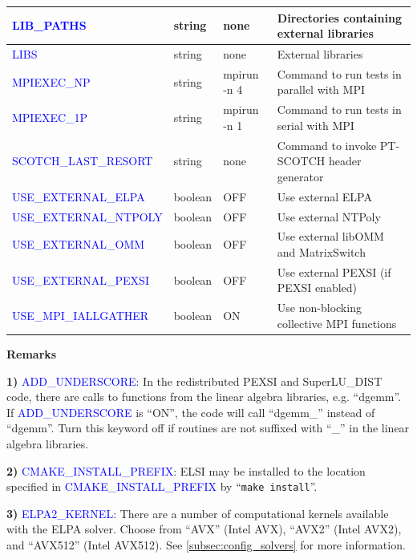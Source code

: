 \documentclass{report}
\begin{document}
\begin{tabular}[]{|p{50mm}|p{15mm}|p{20mm}|p{80mm}|}
\hline
\textcolor{blue}{LIB\_PATHS}               & string  & none        & Directories containing external libraries\\
\hline
\textcolor{blue}{LIBS}                     & string  & none        & External libraries\\
\hline
\textcolor{blue}{MPIEXEC\_NP}              & string  & mpirun -n 4 & Command to run tests in parallel with MPI\\
\hline
\textcolor{blue}{MPIEXEC\_1P}              & string  & mpirun -n 1 & Command to run tests in serial with MPI\\
\hline
\textcolor{blue}{SCOTCH\_LAST\_RESORT}     & string  & none        & Command to invoke PT-SCOTCH header generator\\
\hline
\textcolor{blue}{USE\_EXTERNAL\_ELPA}      & boolean & OFF         & Use external ELPA\\
\hline
\textcolor{blue}{USE\_EXTERNAL\_NTPOLY}    & boolean & OFF         & Use external NTPoly\\
\hline
\textcolor{blue}{USE\_EXTERNAL\_OMM}       & boolean & OFF         & Use external libOMM and MatrixSwitch\\
\hline
\textcolor{blue}{USE\_EXTERNAL\_PEXSI}     & boolean & OFF         & Use external PEXSI (if PEXSI enabled)\\
\hline
\textcolor{blue}{USE\_MPI\_IALLGATHER}     & boolean & ON          & Use non-blocking collective MPI functions\\
\hline
\end{tabular}

\textbf{Remarks}

\textbf{1)} \textcolor{blue}{ADD\_UNDERSCORE}: In the redistributed PEXSI and SuperLU\_DIST code, there are calls to functions from the linear algebra libraries, e.g. ``dgemm''. If \textcolor{blue}{ADD\_UNDERSCORE} is ``ON'', the code will call ``dgemm\_'' instead of ``dgemm''. Turn this keyword off if routines are not suffixed with ``\_'' in the linear algebra libraries.

\textbf{2)} \textcolor{blue}{CMAKE\_INSTALL\_PREFIX}: ELSI may be installed to the location specified in \textcolor{blue}{CMAKE\_INSTALL\_PREFIX} by ``\verb+make install+''.

\textbf{3)} \textcolor{blue}{ELPA2\_KERNEL}: There are a number of computational kernels available with the ELPA solver. Choose from ``AVX'' (Intel AVX), ``AVX2'' (Intel AVX2), and ``AVX512'' (Intel AVX512). See \ref{subsec:config_solvers} for more information.
\end{document}
